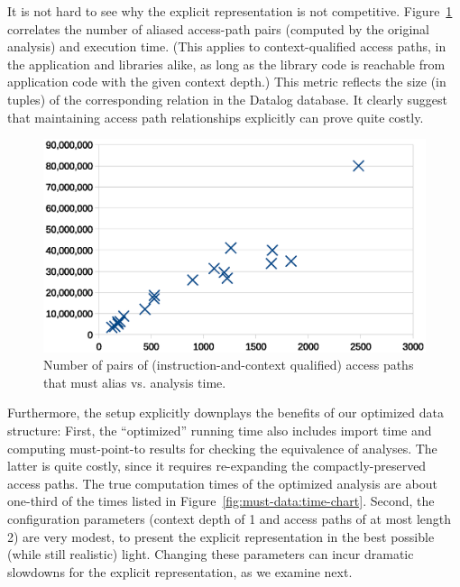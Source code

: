 It is not hard to see why the explicit representation is not competitive. Figure~\ref{fig:must-data:pairs-chart} correlates the number of aliased access-path pairs (computed by the original analysis) and execution time. (This applies to context-qualified access paths, in the application and libraries alike, as long as the library code is reachable from application code with the given context depth.) This metric reflects the size (in tuples) of the corresponding relation in the Datalog database. It clearly suggest that maintaining access path relationships explicitly can prove quite costly.

\begin{figure}[htp]
\centering
\includegraphics[clip,width=\linewidth]{assets/must-data/pairs.eps}
\caption[Number of pairs of access paths vs. analysis time]{Number of pairs of (instruction-and-context qualified) access paths that must alias vs. analysis time.}
\label{fig:must-data:pairs-chart}
\end{figure}

Furthermore, the setup explicitly downplays the benefits of our optimized data structure: First, the ``optimized'' running time also includes import time and computing must-point-to results for checking the equivalence of analyses. The latter is quite costly, since it requires re-expanding the compactly-preserved access paths. The true computation times of the optimized analysis are about one-third of the times listed in Figure~\ref{fig:must-data:time-chart}. Second, the configuration parameters (context depth of 1 and access paths of at most length 2) are very modest, to present the explicit representation in the best possible (while still realistic) light. Changing these parameters can incur dramatic slowdowns for the explicit representation, as we examine next.


